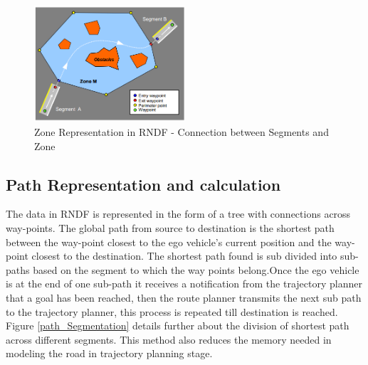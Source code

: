 \begin{figure}
    \centering
    \includegraphics[width=0.5\textwidth]{Images/zone_segment.png}
    \caption{Zone Representation in RNDF - Connection between Segments and Zone}
    \label{zone_segment}
\end{figure}





\subsection{Path Representation and calculation}

The data in RNDF is represented in the form of a tree with connections across way-points. The global path from source to destination is the shortest path between the way-point closest to the ego vehicle's current position and the way-point closest to the destination. The shortest path found is sub divided into sub-paths based on the segment to which the way points belong.Once the ego vehicle is at the end of one sub-path it receives a notification from the trajectory planner that a goal has been reached, then the route planner transmits the next sub path to the trajectory planner, this process is repeated till destination is reached. Figure \ref{path_Segmentation} details further about the division of shortest path across different segments. This method also reduces the memory needed in modeling the road in trajectory planning stage.


